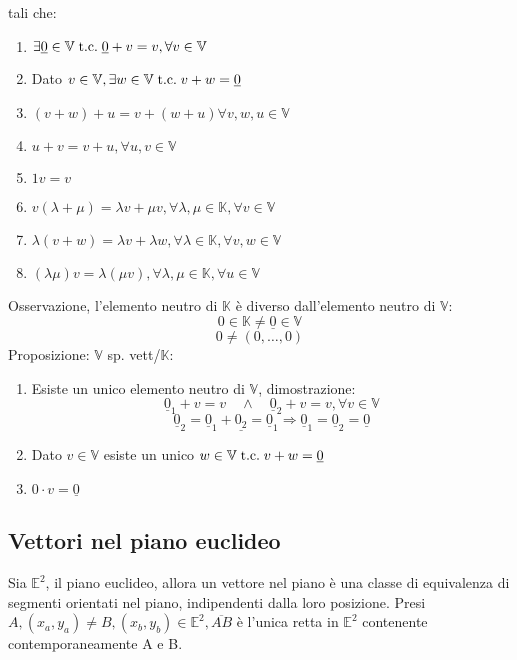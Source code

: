 \documentclass[a4paper,12pt]{article}
\begin{document}
	tali che:
	\begin{enumerate}
		\item $\exists \underline{0} \in \mathbb{V} \;\text{t.c.}\; \underline{0} + v = v, \forall v \in \mathbb{V}$
		\item Dato $v \in \mathbb{V}, \exists w \in \mathbb{V} \;\text{t.c.}\; v + w = \underline{0}$
		\item $(v + w) + u = v + (w + u) \forall v,w,u \in \mathbb{V}$
		\item $u + v = v + u, \forall u,v \in \mathbb{V}$ 
		\item $1v = v$
		\item $v(\lambda + \mu) = \lambda v + \mu v, \forall \lambda, \mu \in \mathbb{K}, \forall v \in \mathbb{V}$
		\item $\lambda (v + w) = \lambda v + \lambda w, \forall \lambda \in \mathbb{K}, \forall v, w \in \mathbb{V}$
		\item $(\lambda \mu)v = \lambda(\mu v), \forall \lambda, \mu \in \mathbb{K}, \forall u \in \mathbb{V}$
	\end{enumerate}
	Osservazione, l'elemento neutro di $\mathbb{K}$ è diverso dall'elemento neutro di $\mathbb{V}$:
	\[0 \in \mathbb{K} \not = \underline{0} \in \mathbb{V}\]
	\[0 \not = (0, \dots, 0)\]
	Proposizione: $\mathbb{V}$ sp. vett/$\mathbb{K}$:
	\begin{enumerate}
		\item Esiste un unico elemento neutro di $\mathbb{V}$, dimostrazione:
		\[\underline{0}_1 + v = v \quad \wedge \quad \underline{0}_2 + v = v, \forall v \in \mathbb{V}\]
		\[\underline{0}_2 = \underline{0}_1 + \underline{0_2} = \underline{0}_1 \Rightarrow \underline{0}_1 = \underline{0}_2 = \underline{0}\]
		\item Dato $v \in \mathbb{V}$ esiste un unico $w \in \mathbb{V} \;\text{t.c.}\; v + w = \underline{0}$
		\item $0 \cdot v = \underline{0}$ 
	\end{enumerate}
	
	\subsection{Vettori nel piano euclideo}
	Sia $\mathbb{E}^2$, il piano euclideo, allora un vettore nel piano è una classe di equivalenza di segmenti orientati nel piano, indipendenti dalla loro posizione.
	Presi $A, (x_a, y_a) \not = B, (x_b, y_b) \in \mathbb{E}^2, \overline{AB}$ è l'unica retta in $\mathbb{E}^2$ contenente contemporaneamente A e B.
	
\end{document}
